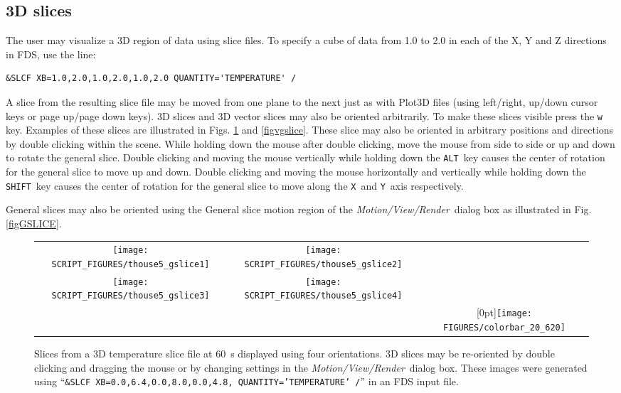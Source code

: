 \documentclass[11pt,twoside]{book}
\begin{document}
\subsection{3D slices}
The user may visualize a 3D region of data using slice files.
To specify a cube of data from 1.0 to 2.0 in each
of the X, Y and Z directions in FDS, use the line:
\begin{lstlisting}
&SLCF XB=1.0,2.0,1.0,2.0,1.0,2.0 QUANTITY='TEMPERATURE' /
\end{lstlisting}

A slice from the resulting slice file
may be moved from one plane to the next just as with Plot3D
files (using left/right, up/down cursor keys or page up/page down
keys).  3D slices and 3D vector slices may also be oriented arbitrarily.
To make these slices visible press the {\tt w} key.  Examples of
these slices are illustrated in Figs. \ref{figgslice} and \ref{figvgslice}.
These slice may also be oriented in arbitrary positions and directions by
double clicking within the scene.  While holding down the mouse after double clicking,
move the mouse from
side to side or up and down to rotate the general slice.  Double clicking and moving
the mouse vertically while holding down the {\tt ALT}\
key causes the center of rotation for the general slice to move up and down.
Double clicking and moving the mouse horizontally and vertically while holding down
the {\tt SHIFT}\ key causes the center of rotation for the general slice to move along
the {\tt X}\ and {\tt Y}\ axis respectively.

General slices may also be oriented using the General slice motion
region of the {\em Motion/View/Render}\ dialog box as illustrated
in Fig. \ref{figGSLICE}.

\begin{figure}[\figoptions]
\begin{center}
\begin{tabular}{ccc}
\texttt{[image: SCRIPT\_FIGURES/thouse5\_gslice1]}&
\texttt{[image: SCRIPT\_FIGURES/thouse5\_gslice2]}\\
\texttt{[image: SCRIPT\_FIGURES/thouse5\_gslice3]}&
\texttt{[image: SCRIPT\_FIGURES/thouse5\_gslice4]}&\\
&&\raisebox{0.0ex}[0pt]{\texttt{[image: FIGURES/colorbar\_20\_620]}}\\
\end{tabular}
\caption [General oriented temperature slices.]
{
Slices from a 3D temperature slice file at 60~s displayed using four orientations.
3D slices may be re-oriented by double clicking and dragging the mouse
or by changing settings in the {\em Motion/View/Render}\ dialog box.
These images were generated using
``{\tt \&SLCF XB=0.0,6.4,0.0,8.0,0.0,4.8, QUANTITY='TEMPERATURE' /}'' in an FDS
input file. }
\label{figgslice}%
\end{center}
\end{figure}
\end{document}
